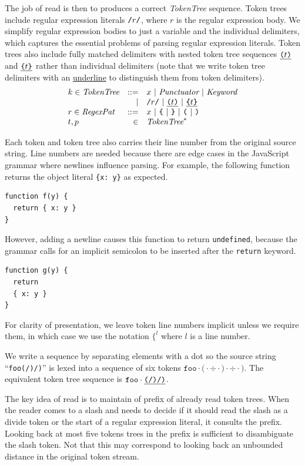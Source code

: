 \documentclass[preprint,10pt]{sigplanconf}
\begin{document}
The job of read is then to produces a correct \textit{TokenTree} sequence. Token trees include regular expression literals $\texttt{/}r\texttt{/}$, where $r$ is the regular expression body. We simplify regular expression bodies to just a variable and the individual delimiters, which captures the essential problems of parsing regular expression literals.
Token trees also include fully matched delimiters with nested token tree sequences $\underline{ \texttt{(} t \texttt{)}}$ and $\underline{ \texttt{\{} t \texttt{\}} }$ rather than individual delimiters (note that we write token tree delimiters with an \underline{underline} to distinguish them from token delimiters).
\[
\begin{array}{lrl}
  k \in \textit{TokenTree} &::=& x ~|~ \textit{Punctuator} ~|~ \textit{Keyword}
  \\
  &|& \texttt{/}r\texttt{/} ~|~ \underline{ \texttt{(} t \texttt{)}} ~|~ \underline{ \texttt{\{} t \texttt{\}} }
  \\
  r \in \textit{RegexPat} &::=& x ~|~ \texttt{\{} ~|~ \texttt{\}}
  ~|~ \texttt{(} ~|~ \texttt{)}
  \\
  t,p &\in& \textit{TokenTree}^{*}
\end{array}
\]

Each token and token tree also carries their line number from the original source string. Line numbers are needed because there are edge cases in the JavaScript grammar 
where newlines influence parsing.
For example,
the following function returns the object literal \verb!{x: y}! as expected. 
\begin{lstlisting}
function f(y) {
  return { x: y }
}
\end{lstlisting}
However, adding a newline causes this function to 
return \verb!undefined!, because the grammar calls for an implicit semicolon to be inserted after the \verb!return! keyword.
\begin{lstlisting}
function g(y) {
  return 
  { x: y }
}
\end{lstlisting}
For clarity of presentation, we leave token line numbers implicit unless we require them, in which case we use the notation $\texttt{\{}^l$ where $l$ is a line number.

We write a sequence by separating elements with a dot so
the source string ``\texttt{foo(/)/)}'' 
is lexed into a sequence
of six tokens \( \texttt{foo}\cdot \texttt{(} \cdot \div \cdot \texttt{)}
\cdot \div \cdot \texttt{)} \). The equivalent token tree sequence is
\(
\texttt{foo} \cdot \underline{ \texttt{(} \texttt{/} \texttt{)} \texttt{/}  \texttt{)}}
\).


The key idea of read is to maintain of prefix of already read token
trees. When the reader comes to a slash and needs to decide if it
should read the slash as a divide token or the start of a regular
expression literal, it consults the prefix. Looking back at most five
tokens trees in the prefix is sufficient to disambiguate the slash
token. Not that this may correspond to looking back an unbounded
distance in the original token stream.
\end{document}

